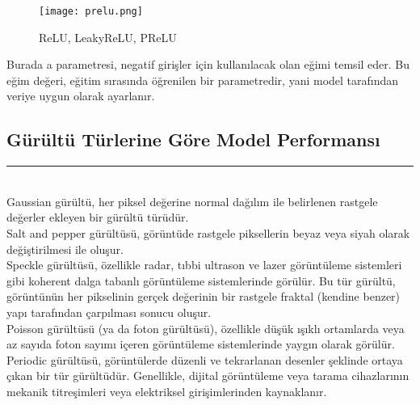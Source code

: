\documentclass{article}
\begin{document}
\renewcommand{\figurename}{Şekil}
\begin{figure}[htbp]
     \centering
\texttt{[image: prelu.png]}\centering 
  \caption{ReLU, LeakyReLU, PReLU\cite{Nomidl}}
  \label{fig:resim_etiketi}
\end{figure}

\noindent Burada a parametresi, negatif girişler için kullanılacak olan eğimi temsil eder. Bu eğim değeri, eğitim sırasında öğrenilen bir parametredir, yani model tarafından veriye uygun olarak ayarlanır.\\[10pt]

\subsection{Gürültü Türlerine Göre Model Performansı}
\rule{\textwidth}{0.5pt}\\[10pt]

\noindent Gaussian gürültü\cite{Wikipedia}, her piksel değerine normal dağılım ile belirlenen rastgele değerler ekleyen bir gürültü türüdür. \\[10pt]

\noindent Salt and pepper gürültüsü\cite{Wikipedia}, görüntüde rastgele piksellerin beyaz veya siyah olarak değiştirilmesi ile oluşur. \\[10pt]


\noindent Speckle gürültüsü\cite{Wikipedia2}, özellikle radar, tıbbi ultrason ve lazer görüntüleme sistemleri gibi koherent dalga tabanlı görüntüleme sistemlerinde görülür. Bu tür gürültü, görüntünün her pikselinin gerçek değerinin bir rastgele fraktal (kendine benzer) yapı tarafından çarpılması sonucu oluşur. \\[10pt]

\noindent Poisson gürültüsü (ya da foton gürültüsü)\cite{Wikipedia}, özellikle düşük ışıklı ortamlarda veya az sayıda foton sayımı içeren görüntüleme sistemlerinde yaygın olarak görülür.  \\[10pt]

\noindent Periodic gürültüsü\cite{Wikipedia}, görüntülerde düzenli ve tekrarlanan desenler şeklinde ortaya çıkan bir tür gürültüdür. Genellikle, dijital görüntüleme veya tarama cihazlarının mekanik titreşimleri veya elektriksel girişimlerinden kaynaklanır. \\[10pt]

\renewcommand{\tablename}{Tablo}
\end{document}
